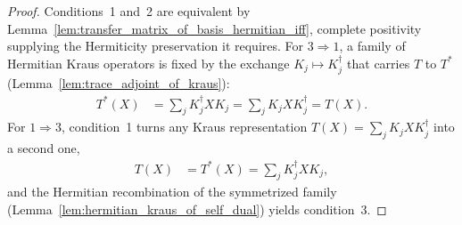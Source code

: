 \begin{proof}\leanok
    Conditions~1 and~2 are equivalent by
    Lemma~\ref{lem:transfer_matrix_of_basis_hermitian_iff}, complete positivity
    supplying the Hermiticity preservation it requires. For $3\Rightarrow1$, a
    family of Hermitian Kraus operators is fixed by the exchange
    $K_j\mapsto K_j^\dagger$ that carries $T$ to $T^*$
    (Lemma~\ref{lem:trace_adjoint_of_kraus}):
    \begin{align}
        T^*(X)
        &= \sum_j K_j^\dagger XK_j
         = \sum_j K_jXK_j^\dagger
         = T(X).
    \end{align}
    For $1\Rightarrow3$, condition~1 turns any Kraus representation
    $T(X)=\sum_jK_jXK_j^\dagger$ into a second one,
    \begin{align}
        T(X)
        &= T^*(X)
         = \sum_j K_j^\dagger XK_j,
    \end{align}
    and the Hermitian recombination of the symmetrized family
    (Lemma~\ref{lem:hermitian_kraus_of_self_dual}) yields condition~3.
\end{proof}